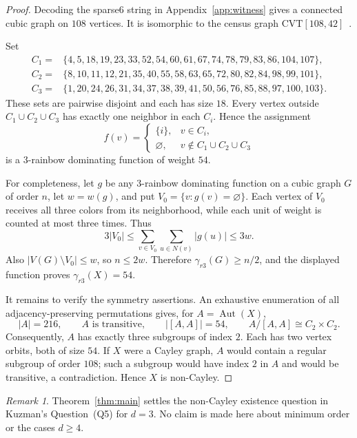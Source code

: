 \documentclass[11pt]{amsart}
\theoremstyle{remark}
\newtheorem{remark}[theorem]{Remark}
\newcommand{\Aut}{\operatorname{Aut}}
\newcommand{\gr}{\gamma_{r3}}
\begin{document}
\begin{proof}
Decoding the sparse6 string in Appendix~\ref{app:witness} gives a connected
cubic graph on $108$ vertices.  It is isomorphic to the census graph
$\mathrm{CVT}[108,42]$~\cite{PSV2013,CensusData}.

Set
\begin{align*}
C_1={}&\{4,5,18,19,23,33,52,54,60,61,67,74,78,79,83,86,104,107\},\\
C_2={}&\{8,10,11,12,21,35,40,55,58,63,65,72,80,82,84,98,99,101\},\\
C_3={}&\{1,20,24,26,31,34,37,38,39,41,50,56,76,85,88,97,100,103\}.
\end{align*}
These sets are pairwise disjoint and each has size $18$.  Every vertex outside
$C_1\cup C_2\cup C_3$ has exactly one neighbor in each $C_i$.  Hence the
assignment
\[
 f(v)=
 \begin{cases}
  \{i\},&v\in C_i,\\
  \varnothing,&v\notin C_1\cup C_2\cup C_3
 \end{cases}
\]
is a $3$-rainbow dominating function of weight $54$.

For completeness, let $g$ be any $3$-rainbow dominating function on a cubic
graph $G$ of order $n$, let $w=w(g)$, and put
$V_0=\{v:g(v)=\varnothing\}$.  Each vertex of $V_0$ receives all three colors
from its neighborhood, while each unit of weight is counted at most three
times.  Thus
\[
 3|V_0|
 \leq \sum_{v\in V_0}\sum_{u\in N(v)}|g(u)|
 \leq 3w.
\]
Also $|V(G)\setminus V_0|\leq w$, so $n\leq 2w$.  Therefore
$\gr(G)\geq n/2$, and the displayed function proves $\gr(X)=54$.

It remains to verify the symmetry assertions.  An exhaustive enumeration of
all adjacency-preserving permutations gives, for $A=\Aut(X)$,
\[
 |A|=216,
 \qquad A\text{ is transitive},
 \qquad |[A,A]|=54,
 \qquad A/[A,A]\cong C_2\times C_2.
\]
Consequently, $A$ has exactly three subgroups of index $2$.  Each has two
vertex orbits, both of size $54$.  If $X$ were a Cayley graph, $A$ would
contain a regular subgroup of order $108$; such a subgroup would have index
$2$ in $A$ and would be transitive, a contradiction.  Hence $X$ is
non-Cayley.

\end{proof}

\begin{remark}
Theorem~\ref{thm:main} settles the non-Cayley existence question in
Kuzman's Question~\textup{(Q5)} for $d=3$.  No claim is made here about
minimum order or the cases $d\geq4$.
\end{remark}
\end{document}
